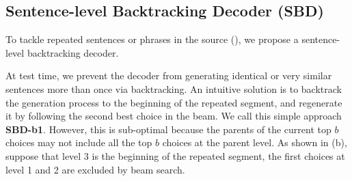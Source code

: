 \subsection{Sentence-level Backtracking Decoder (SBD)}
\label{sec:sbd}

To tackle repeated sentences or phrases in the source (), 
we propose a sentence-level backtracking decoder.


At test time, we prevent the decoder from generating identical or
very similar sentences more than once via backtracking. 
An intuitive solution is to backtrack the generation process to the beginning
of the repeated segment, and regenerate it by following the second best choice
in the beam. We call this simple approach \textbf{SBD-b1}.
However, this is sub-optimal
because the parents of the current top $b$ choices may not include all the top $b$ choices at the
parent level. 
As shown in  (b), suppose that level 3 is the
beginning of the repeated segment, the first choices at level 1 and 2 are excluded by beam search. 

